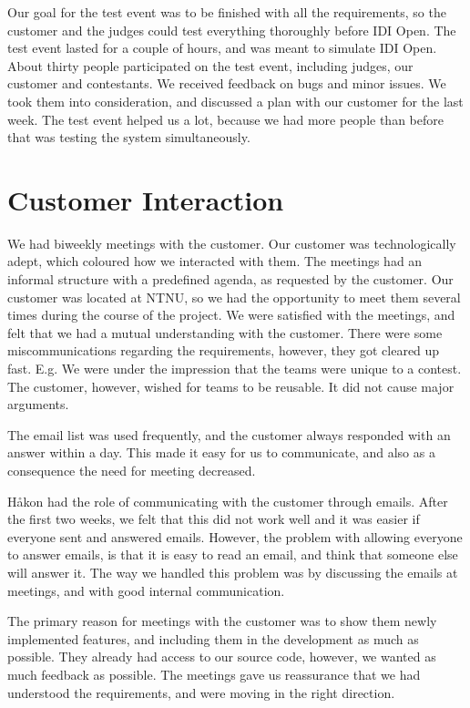 Our goal for the test event was to be finished with all the
requirements, so the customer and the judges could test everything
thoroughly before IDI Open. The test event lasted for a couple of
hours, and was meant to simulate IDI Open. About thirty people
participated on the test event, including judges, our customer and
contestants. We received feedback on bugs and minor issues. We took
them into consideration, and discussed a plan with our customer for the
last week. The test event helped us a lot, because we had more people
than before that was testing the system simultaneously. 

\section{Customer Interaction}

We had biweekly meetings with the customer. Our customer was
technologically adept, which coloured how we interacted with them. The
meetings had an informal structure with a predefined agenda, as
requested by the customer. Our customer was located at NTNU, so we had
the opportunity to meet them several times during the course of the
project. We were satisfied with the meetings, and felt that we had a
mutual understanding with the customer. There were some
miscommunications regarding the requirements, however, they got cleared
up fast. E.g. We were under the impression that the teams were unique
to a contest. The customer, however, wished for teams to be reusable.
It did not cause major arguments.

The email list was used frequently, and the customer always responded
with an answer within a day. This made it easy for us to communicate,
and also as a consequence the need for meeting decreased. 

H{\aa}kon had the role of communicating with the customer through emails.
After the first two weeks, we felt that this did not work well and it
was easier if everyone sent and answered emails. However, the problem
with allowing everyone to answer emails, is that it is easy to read an
email, and think that someone else will answer it. The way we handled
this problem was by discussing the emails at meetings, and with good
internal communication. 

The primary reason for meetings with the customer was to show them newly
implemented features, and including them in the development as much as
possible. They already had access to our source code, however, we
wanted as much feedback as possible. The meetings gave us reassurance
that we had understood the requirements, and were moving in the right
direction. 

